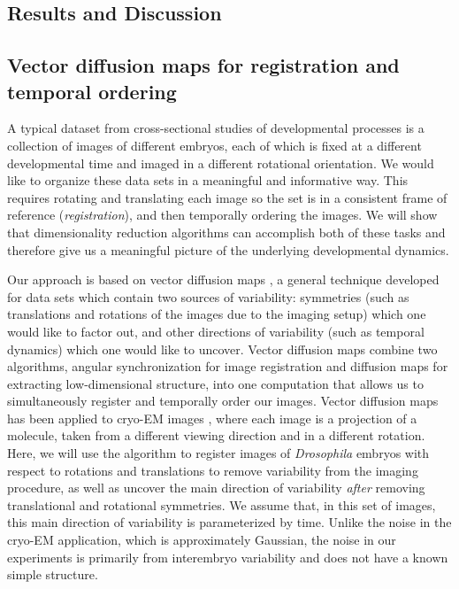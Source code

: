 \documentclass{pnastwo}
\begin{document}
\begin{article}
\section{Results and Discussion}

\subsection{Vector diffusion maps for registration and temporal ordering}

A typical dataset from cross-sectional studies of developmental processes is a collection of images of different embryos, each of which is fixed at a different developmental time and imaged in a different rotational orientation.
%
We would like to organize these data sets in a meaningful and informative way.
%
This requires rotating and translating each image so the set is in a consistent frame of reference ({\it registration}), and then temporally ordering the images. 
%
We will show that dimensionality reduction algorithms can accomplish both of these tasks and therefore give us a meaningful picture of the underlying developmental dynamics. 

Our approach is based on vector diffusion maps \cite{singer2012vector}, a general technique developed for data sets which contain two sources of variability:
symmetries (such as translations and rotations of the images due to the imaging setup) which one would like to factor out, and other directions of variability (such as temporal dynamics) which one would like to uncover.
%
Vector diffusion maps combine two algorithms, angular synchronization \cite{singer2011angular} for image registration and diffusion maps \cite{coifman2005geometric} for extracting low-dimensional structure, into one computation that allows us to simultaneously register and temporally order our images. 
%
Vector diffusion maps has been applied to cryo-EM images \cite{...}, where each image is a projection of a molecule, taken from a different viewing direction and in a different rotation. 
%
Here, we will use the algorithm to register images of {\it Drosophila} embryos with respect to rotations and translations to remove variability from the imaging procedure, as well as uncover the main direction of variability {\it after} removing translational and rotational symmetries.
%
We assume that, in this set of images, this main direction of variability is parameterized by time. 
%
Unlike the noise in the cryo-EM application, which is approximately Gaussian, the noise in our experiments is primarily from interembryo variability and does not have a known simple structure.


\end{article}
\end{document}
